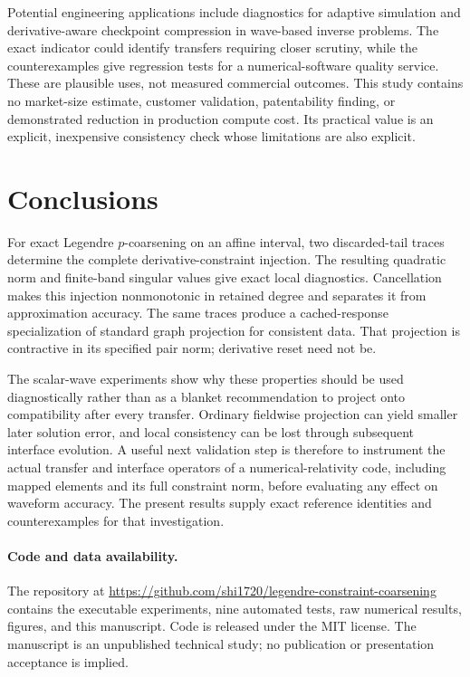 \documentclass[11pt]{article}
\begin{document}
Potential engineering applications include diagnostics for adaptive simulation and derivative-aware checkpoint compression in wave-based inverse problems. The exact indicator could identify transfers requiring closer scrutiny, while the counterexamples give regression tests for a numerical-software quality service. These are plausible uses, not measured commercial outcomes. This study contains no market-size estimate, customer validation, patentability finding, or demonstrated reduction in production compute cost. Its practical value is an explicit, inexpensive consistency check whose limitations are also explicit.

\section{Conclusions}
For exact Legendre \(p\)-coarsening on an affine interval, two discarded-tail traces determine the complete derivative-constraint injection. The resulting quadratic norm and finite-band singular values give exact local diagnostics. Cancellation makes this injection nonmonotonic in retained degree and separates it from approximation accuracy. The same traces produce a cached-response specialization of standard graph projection for consistent data. That projection is contractive in its specified pair norm; derivative reset need not be.

The scalar-wave experiments show why these properties should be used diagnostically rather than as a blanket recommendation to project onto compatibility after every transfer. Ordinary fieldwise projection can yield smaller later solution error, and local consistency can be lost through subsequent interface evolution. A useful next validation step is therefore to instrument the actual transfer and interface operators of a numerical-relativity code, including mapped elements and its full constraint norm, before evaluating any effect on waveform accuracy. The present results supply exact reference identities and counterexamples for that investigation.

\paragraph{Code and data availability.}
The repository at \url{https://github.com/shi1720/legendre-constraint-coarsening} contains the executable experiments, nine automated tests, raw numerical results, figures, and this manuscript. Code is released under the MIT license. The manuscript is an unpublished technical study; no publication or presentation acceptance is implied.
\end{document}
